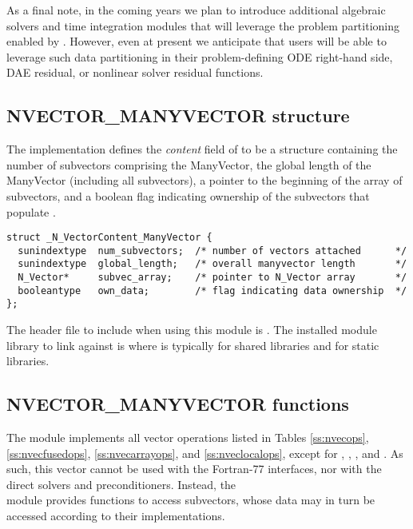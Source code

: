 As a final note, in the coming years we plan to introduce additional
algebraic solvers and time integration modules that will leverage the
problem partitioning enabled by {\nvecmanyvector}.  However, even at
present we anticipate that users will be able to leverage such data
partitioning in their problem-defining ODE right-hand side, DAE
residual, or nonlinear solver residual functions.


\subsection{NVECTOR\_MANYVECTOR structure}
\label{ss:nvec_manyvector_structure}

The {\nvecmanyvector} implementation defines the {\em content} field
of  to be a structure containing the number of
subvectors comprising the ManyVector, the global length of the
ManyVector (including all subvectors), a pointer to
the beginning of the array of subvectors, and a boolean flag
 indicating ownership of the subvectors that populate
.
\begin{verbatim}
struct _N_VectorContent_ManyVector {
  sunindextype  num_subvectors;  /* number of vectors attached      */
  sunindextype  global_length;   /* overall manyvector length       */
  N_Vector*     subvec_array;    /* pointer to N_Vector array       */
  booleantype   own_data;        /* flag indicating data ownership  */
};
\end{verbatim}

The header file to include when using this module is
. The installed module library to link against is
 where  is typically
 for shared libraries and  for static libraries.



\subsection{NVECTOR\_MANYVECTOR functions}
\label{ss:nvec_manyvector_functions}

The {\nvecmanyvector} module implements all vector operations listed
in Tables \ref{ss:nvecops}, \ref{ss:nvecfusedops}, \ref{ss:nvecarrayops},
and \ref{ss:nveclocalops}, except for ,
, , and
.  As such, this vector cannot be
used with the {\sundials} Fortran-77 interfaces, nor with the
{\sundials} direct solvers and preconditioners. Instead, the \\
{\nvecmanyvector} module provides functions to access subvectors,
whose data may in turn be accessed according to their {\nvector}
implementations.

